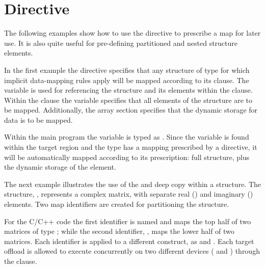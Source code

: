 \pagebreak
\section{ Directive}
\label{sec:declare_mapper}

The following examples show how to use the 
directive to prescribe a map for later use.
It is also quite useful for pre-defining partitioned and nested 
structure elements.

In the first example the  directive specifies 
that any structure of type  for which implicit data-mapping
rules apply will be mapped according to its  clause.
The variable  is used for referencing the structure and its 
elements within the  clause. 
Within the  clause the  variable specifies that all
elements of the structure are to be mapped.  Additionally, the
array section  specifies that the dynamic 
storage for data is to be mapped. 

Within the main program the  variable is typed as .
Since the variable is found within the target region and the type has a mapping prescribed by
a  directive, it will be automatically mapped according to its prescription: 
full structure, plus the dynamic storage of the  element. 




The next example illustrates the use of the  and deep copy within a structure. 
The structure, ,  represents a complex matrix, 
with separate real () and imaginary () elements.
Two map identifiers are created for partitioning the  structure.

For the C/C++ code the first identifier is named  and maps the top half of
two matrices of type ; while the second identifier, ,
maps the lower half of two matrices. 
Each identifier is applied to a different  construct,
as   
and .
Each target offload is allowed to execute concurrently on two different devices 
( and ) through the  clause.

